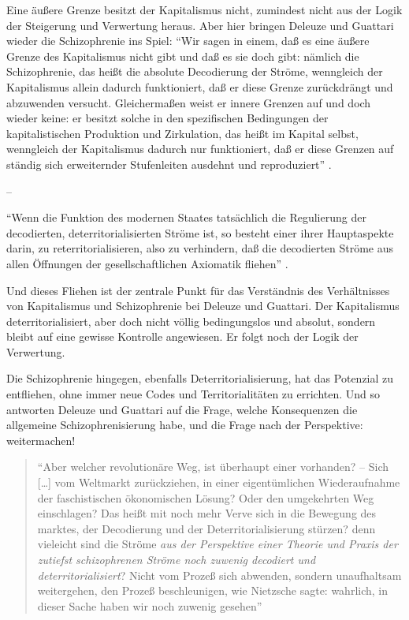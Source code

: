 \documentclass[12pt,
               DIV13,
               paper=a4,
               twoside=false,
               onehalfspacing,
               bibliography=totoc,
               toc=graduated,
               draft,
               ]{scrartcl}
\newcommand{\lips}{\dots\unkern}
\newcommand{\pc}[2]{\parencite[#1]{#2}}
\newcommand{\worries}[1]{\ifdraft{\textcolor{blue}{\texttt{(#1)}}}{}}
\begin{document}
Eine äußere Grenze besitzt der Kapitalismus nicht, zumindest nicht aus
der Logik der Steigerung und Verwertung heraus. Aber hier bringen
Deleuze und Guattari wieder die Schizophrenie ins Spiel: "`Wir sagen
in einem, daß es eine äußere Grenze des Kapitalismus nicht gibt und
daß es sie doch gibt: nämlich die Schizophrenie, das heißt die
absolute Decodierung der Ströme, wenngleich der Kapitalismus allein
dadurch funktioniert, daß er diese Grenze zurückdrängt und abzuwenden
versucht. Gleichermaßen weist er innere Grenzen auf und doch wieder
keine: er besitzt solche in den spezifischen Bedingungen der
kapitalistischen Produktion und Zirkulation, das heißt im Kapital
selbst, wenngleich der Kapitalismus dadurch nur funktioniert, daß er
diese Grenzen auf ständig sich erweiternder Stufenleiten ausdehnt und
reproduziert"' \pc{322}{ao}.

--

"`Wenn die Funktion des modernen Staates tatsächlich die Regulierung
der decodierten, deterritorialisierten Ströme ist, so besteht einer
ihrer Hauptaspekte darin, zu reterritorialisieren, also zu verhindern,
daß die decodierten Ströme aus allen Öffnungen der gesellschaftlichen
Axiomatik fliehen"' \pc{332}{ao}.

Und dieses Fliehen ist der zentrale Punkt für das Verständnis des
Verhältnisses von Kapitalismus und Schizophrenie \worries{?} bei
Deleuze und Guattari. Der Kapitalismus deterritorialisiert, aber doch
nicht völlig bedingungslos und absolut, sondern bleibt auf eine gewisse
Kontrolle angewiesen. Er folgt noch der Logik der Verwertung.

Die Schizophrenie hingegen, ebenfalls Deterritorialisierung, hat das
Potenzial zu entfliehen, ohne immer neue Codes und Territorialitäten
zu errichten. Und so antworten Deleuze und Guattari auf die Frage,
welche Konsequenzen die allgemeine Schizophrenisierung habe, und die
Frage nach der Perspektive: weitermachen!
%
\begin{spacing}{1}
\begin{quote}
"`Aber welcher revolutionäre Weg, ist überhaupt einer vorhanden? -- Sich
[\lips] vom Weltmarkt zurückziehen, in einer eigentümlichen
Wiederaufnahme der faschistischen \glq ökonomischen Lösung\grq? Oder
den umgekehrten Weg einschlagen? Das heißt mit noch mehr Verve sich in
die Bewegung des marktes, der Decodierung und der
Deterritorialisierung stürzen? denn vieleicht sind die Ströme
\emph{aus der Perspektive einer Theorie und Praxis der zutiefst
schizophrenen Ströme noch zuwenig decodiert und deterritorialisiert}?
Nicht vom Prozeß sich abwenden, sondern unaufhaltsam weitergehen, \glq
den Prozeß beschleunigen\grq, wie Nietzsche sagte: wahrlich, in dieser
Sache haben wir noch zuwenig gesehen"' \pc{S. 308, meine Hervorh.}{ao}
\worries{Ende doch eine Relativierung? also raus?}
\end{quote}
\end{spacing}
\end{document}
